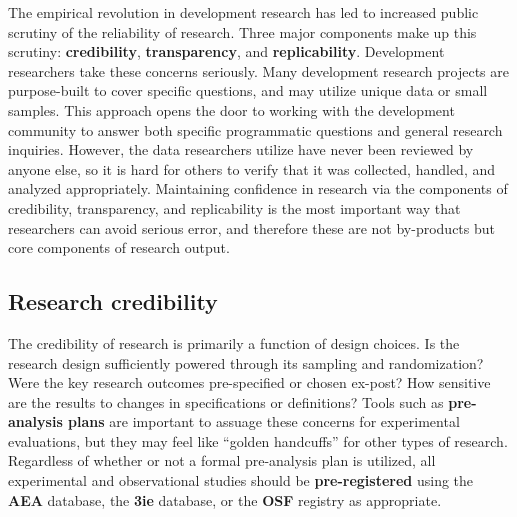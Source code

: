 The empirical revolution in development research
has led to increased public scrutiny of the reliability of research.\cite{rogers_2017}
Three major components make up this scrutiny: \textbf{credibility},\cite{ioannidis2017power} \textbf{transparency},\cite{christensen2018transparency} and \textbf{replicability}.\cite{duvendack2017meant}
Development researchers take these concerns seriously.
Many development research projects are purpose-built to cover specific questions,
and may utilize unique data or small samples.
This approach opens the door to working with the development community
to answer both specific programmatic questions and general research inquiries.
However, the data researchers utilize have never been reviewed by anyone else,
so it is hard for others to verify that it was collected, handled, and analyzed appropriately.
Maintaining confidence in research via the components of credibility, transparency, and replicability
is the most important way that researchers can avoid serious error,
and therefore these are not by-products but core components of research output.

\subsection{Research credibility}

The credibility of research is primarily a function of design choices.\cite{angrist2010credibility,ioannidis2005most}
Is the research design sufficiently powered through its sampling and randomization?
Were the key research outcomes pre-specified or chosen ex-post?
How sensitive are the results to changes in specifications or definitions?
Tools such as \textbf{pre-analysis plans}
are important to assuage these concerns for experimental evaluations,
but they may feel like ``golden handcuffs'' for other types of research.\cite{olken2015promises}
Regardless of whether or not a formal pre-analysis plan is utilized,
all experimental and observational studies should be \textbf{pre-registered}
using the \textbf{AEA} database,
the \textbf{3ie} database,
or the \textbf{OSF} registry as appropriate.

